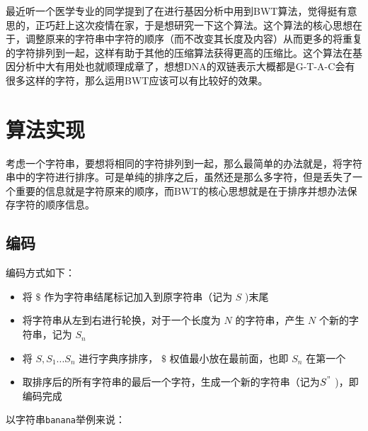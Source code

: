 \documentclass[12pt]{article}
\begin{document}
\makeblogtitle

最近听一个医学专业的同学提到了在进行基因分析中用到BWT算法，觉得挺有意思的，正巧赶上这次疫情在家，于是想研究一下这个算法。这个算法的核心思想在于，调整原来的字符串中字符的顺序（而不改变其长度及内容）从而更多的将重复的字符排列到一起，这样有助于其他的压缩算法获得更高的压缩比。这个算法在基因分析中大有用处也就顺理成章了，想想DNA的双链表示大概都是G-T-A-C会有很多这样的字符，那么运用BWT应该可以有比较好的效果。

\section{算法实现}\label{ux7b97ux6cd5ux5b9eux73b0}

考虑一个字符串，要想将相同的字符排列到一起，那么最简单的办法就是，将字符串中的字符进行排序。可是单纯的排序之后，虽然还是那么多字符，但是丢失了一个重要的信息就是字符原来的顺序，而BWT的核心思想就是在于排序并想办法保存字符的顺序信息。

\subsection{编码}\label{ux7f16ux7801}

编码方式如下：

\begin{itemize}
\tightlist
\item
  将 \({\displaystyle \$}\) 作为字符串结尾标记加入到原字符串（记为 \({\displaystyle S}\) )末尾
\item
  将字符串从左到右进行轮换，对于一个长度为 \({\displaystyle N}\) 的字符串，产生 \({\displaystyle N}\) 个新的字符串，记为 \({\displaystyle S_{n}}\)
\item
  将 \({\displaystyle S, S_{1}...S_{n}}\) 进行字典序排序， \({\displaystyle \$}\) 权值最小放在最前面，也即 \({\displaystyle S_{n}}\) 在第一个
\item
  取排序后的所有字符串的最后一个字符，生成一个新的字符串（记为\({\displaystyle S^{"}}\) )，即编码完成
\end{itemize}

以字符串\texttt{banana}举例来说：
\end{document}
